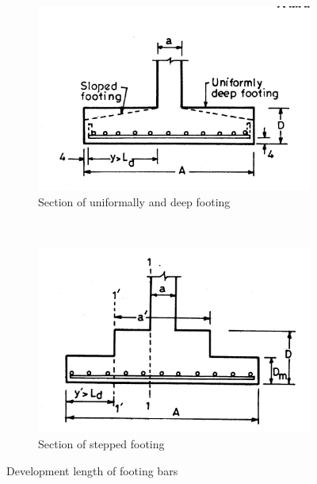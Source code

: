 \begin{figure}
  \centering
  \begin{subfigure}[b]{0.5\textwidth}
    \includegraphics[width=\textwidth]{images/fig2341.png}
    \caption{Section of uniformally and deep footing}
    \label{uniformallydeepfooting}
  \end{subfigure}\\
  \begin{subfigure}[b]{0.5\textwidth}
    \includegraphics[width=\textwidth]{images/fig2342.png}
    \caption{Section of stepped footing}
    \label{stepedfoting}
  \end{subfigure}
\caption{Development length of footing bars}
\end{figure}

